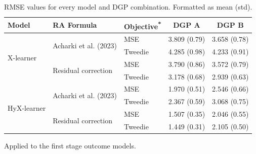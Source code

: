 \begin{table}[H]
    \centering
    \caption{RMSE values for every model and DGP combination. Formatted as mean (std).}
    \label{tab:main_experiment}
    \begin{threeparttable}
        \begin{tabular}{l l l c c}
            \toprule
            Model & RA Formula & Objective\textsuperscript{*} & DGP A & DGP B \\
            \midrule
            \multirow{4}{*}{X-learner}
                & \multirow{2}{*}{Acharki et al. (2023)}
                                & MSE     & 3.809 (0.79) & 3.658 (0.78) \\
                &               & Tweedie & 4.285 (0.98) & 4.233 (0.91) \\
                & \multirow{2}{*}{Residual correction}
                                & MSE     & 3.790 (0.86) & 3.572 (0.79) \\
                &               & Tweedie & 3.178 (0.68) & 2.939 (0.63) \\
            \midrule
            \multirow{4}{*}{HyX-learner}
                & \multirow{2}{*}{Acharki et al. (2023)}
                                & MSE     & 1.970 (0.51) & 2.546 (0.66) \\
                &               & Tweedie & 2.367 (0.59) & 3.068 (0.75) \\
                & \multirow{2}{*}{Residual correction}
                                & MSE     & 1.507 (0.35) & 2.046 (0.55) \\
                &               & Tweedie & 1.449 (0.31) & 2.105 (0.50) \\
            \bottomrule
        \end{tabular}
        \begin{tablenotes}
            \small
            \item[*] Applied to the first stage outcome models.
        \end{tablenotes}
    \end{threeparttable}
\end{table}